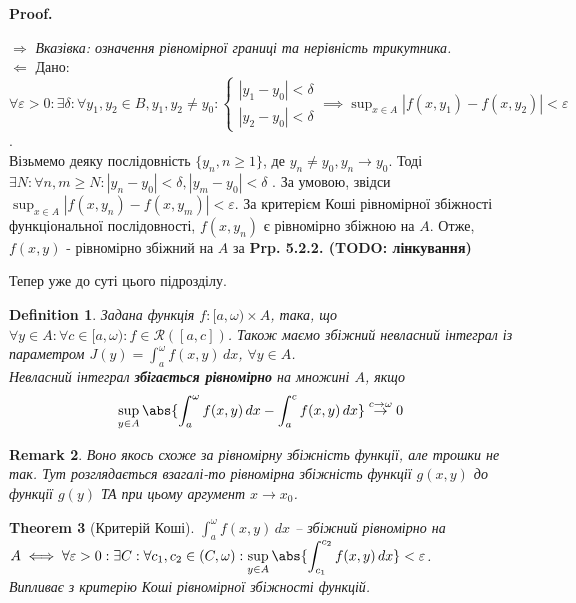 \documentclass[a4paper, 10pt]{article}
\makeatletter
\def\huge{\displaystyle}
\def\qed{$\blacksquare$}
\def\rightproof{$\boxed{\Rightarrow}$ }
\def\leftproof{$\boxed{\Leftarrow}$ }
\theoremstyle{theoremdd}
\newtheorem{theorem}{Theorem}[subsection]
\theoremstyle{theoremdd}
\theoremstyle{theoremdd}
\newtheorem{definition}[theorem]{Definition}
\theoremstyle{theoremdd}
\theoremstyle{theoremdd}
\theoremstyle{theoremdd}
\theoremstyle{theoremdd}
\newtheorem{remark}[theorem]{Remark}
\theoremstyle{theoremdd}
\theoremstyle{theoremdd}
\renewenvironment{proof}[1][Proof.\\]{\par
\pushQED{\hfill \qed}%
\normalfont \topsep6\p@\@plus6\p@\relax
\trivlist
\item\relax
{\bfseries
#1\@addpunct{.}}\hspace\labelsep\ignorespaces
}{%
\popQED\endtrivlist\@endpefalse
}
\makeatother
\begin{document}
\begin{proof}
\rightproof \textit{Вказівка: означення рівномірної границі та нерівність трикутника.}
\bigskip \\
\leftproof Дано: $\forall \varepsilon > 0: \exists \delta: \forall y_1,y_2 \in B, y_1,y_2 \neq y_0: \begin{cases} |y_1-y_0| < \delta \\ |y_2-y_0| < \delta \end{cases} \implies \huge\sup_{x \in A} |f(x,y_1)-f(x,y_2)| < \varepsilon$.\\
Візьмемо деяку послідовність $\{y_n, n \geq 1\}$, де $y_n \neq y_0, y_n \to y_0$. Тоді \\ $\exists N: \forall n,m \geq N: |y_n-y_0| < \delta, |y_m - y_0| < \delta$ . За умовою, звідси $\huge\sup_{x \in A} |f(x,y_n) - f(x,y_m)| < \varepsilon$. За критерієм Коші рівномірної збіжності функціональної послідовності, $f(x,y_n)$ є рівномірно збіжною на $A$. Отже, $f(x,y)$ - рівномірно збіжний на $A$ за \textbf{Prp. 5.2.2. (TODO: лінкування)}
\end{proof}

Тепер уже до суті цього підрозділу.

\begin{definition}
Задана функція $f \colon [a,\omega) \times A$, така, що $\forall y \in A: \forall c \in [a,\omega): f\in \mathcal{R}([a,c])$. Також маємо збіжний невласний інтеграл із параметром $J(y)= \huge \int_a^\omega f(x,y)\,dx$, $\forall y \in A$.\\
Невласний інтеграл \textbf{збігається рівномірно} на множині $A$, якщо
\begin{align*}
\huge \sup_{y \in A} \abs{\int_a^\omega f(x,y)\,dx - \int_a^c f(x,y)\,dx} \overset{c \to \omega}{\to} 0
\end{align*}
\end{definition}

\begin{remark}
Воно якось схоже за рівномірну збіжність функції, але трошки не так. Тут розглядається взагалі-то рівномірна збіжність функції $g(x,y)$ до функції $g(y)$ ТА при цьому аргумент $x \to x_0$.
\end{remark}

\begin{theorem}[Критерій Коші]
$\huge \int_a^\omega f(x,y)\,dx$ -- збіжний рівномірно на $A \iff \forall \varepsilon > 0: \exists C: \forall c_1,c_2 \in (C,\omega): \huge \sup_{y \in A} \abs{\int_{c_1}^{c_2} f(x,y)\,dx} < \varepsilon$.\\
\textit{Випливає з критерію Коші рівномірної збіжності функцій.}
\end{theorem}
\end{document}

